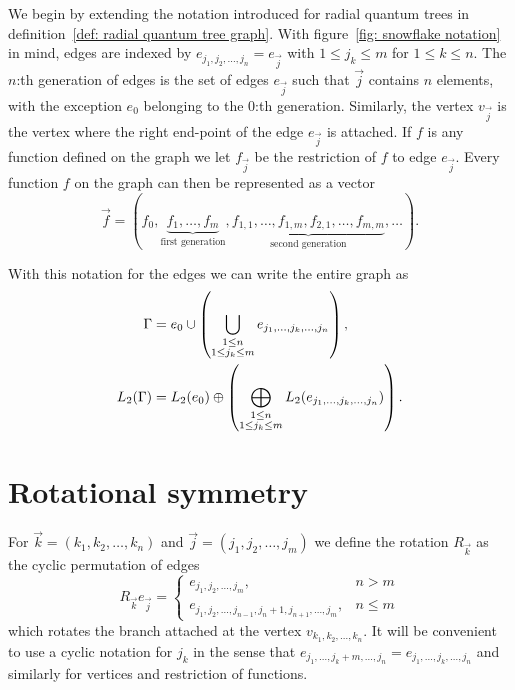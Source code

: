 We begin by extending the notation introduced for radial quantum trees in definition~\ref{def: radial quantum tree graph}. With figure~\ref{fig: snowflake notation} in mind, edges are indexed by $e_{j_1,j_2,\ldots,j_n} = e_{\vec{j}}$ with $1 \le j_k \le m$ for $1 \le k \le n$. The $n$:th generation of edges is the set of edges $e_{\vec{j}}$ such that $\vec{j}$ contains $n$ elements, with the exception $e_0$ belonging to the 0:th generation. Similarly, the vertex $v_{\vec{j}}$ is the vertex where the right end-point of the edge $e_{\vec{j}}$ is attached. If $f$ is any function defined on the graph we let $f_{\vec{j}}$ be the restriction of $f$ to edge $e_{\vec{j}}$. Every function $f$ on the graph can then be represented as a vector
\[
  \vec{f} =
  (f_0,
  \underbrace{f_1, \ldots, f_m}_{\text{first generation}},
  \underbrace{f_{1,1}, \ldots, f_{1,m}, f_{2,1}, \ldots, f_{m,m}}_{\text{second generation}},
  \ldots).
\]

With this notation for the edges we can write the entire graph as
\begin{align*}
  \Gamma &= e_0 \cup \left(\bigcup_{\substack{
    1 \le n \\
    1 \le j_k \le m
  }}
  e_{j_1,\ldots,j_k,\ldots,j_n}\right), \\
  L_2(\Gamma) &= L_2(e_0) \oplus \left(\bigoplus_{\substack{
    1 \le n \\
    1 \le j_k \le m
  }}
  L_2(e_{j_1,\ldots,j_k,\ldots,j_n})\right).
\end{align*}



\section{Rotational symmetry}\label{sec: snowflake rotational symmetry}

For $\vec{k} = (k_1, k_2, \ldots, k_n)$ and $\vec{j} = (j_1, j_2, \ldots, j_m)$ we define the rotation $R_{\vec{k}}$ as the cyclic permutation of edges
\[
  R_{\vec{k}} e_{\vec{j}} =
  \begin{cases}
    e_{j_1, j_2, \ldots, j_m}, & n > m \\
    e_{j_1, j_2, \ldots, j_{n-1}, j_n + 1, j_{n+1}, \ldots, j_m}, & n \le m
  \end{cases}
\]
which rotates the branch attached at the vertex $v_{k_1, k_2, \ldots, k_n}$. It will be convenient to use a cyclic notation for $j_k$ in the sense that $e_{j_1, \ldots, j_k+m, \ldots, j_n} = e_{j_1, \ldots, j_k, \ldots, j_n}$ and similarly for vertices and restriction of functions.

